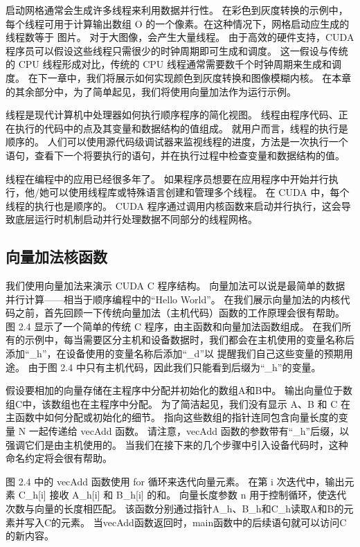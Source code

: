 启动网格通常会生成许多线程来利用数据并行性。 在彩色到灰度转换的示例中，每个线程可用于计算输出数组 O 的一个像素。在这种情况下，网格启动应生成的线程数等于 图片。 对于大图像，会产生大量线程。 由于高效的硬件支持，CUDA 程序员可以假设这些线程只需很少的时钟周期即可生成和调度。 这一假设与传统的 CPU 线程形成对比，传统的 CPU 线程通常需要数千个时钟周期来生成和调度。 在下一章中，我们将展示如何实现颜色到灰度转换和图像模糊内核。 在本章的其余部分中，为了简单起见，我们将使用向量加法作为运行示例。

\begin{remark}[线程]
线程是现代计算机中处理器如何执行顺序程序的简化视图。 线程由程序代码、正在执行的代码中的点及其变量和数据结构的值组成。 就用户而言，线程的执行是顺序的。 人们可以使用源代码级调试器来监视线程的进度，方法是一次执行一个语句，查看下一个将要执行的语句，并在执行过程中检查变量和数据结构的值。

线程在编程中的应用已经很多年了。 如果程序员想要在应用程序中开始并行执行，他/她可以使用线程库或特殊语言创建和管理多个线程。 在 CUDA 中，每个线程的执行也是顺序的。 CUDA 程序通过调用内核函数来启动并行执行，这会导致底层运行时机制启动并行处理数据不同部分的线程网格。
\end{remark}

\subsection{向量加法核函数}
我们使用向量加法来演示 CUDA C 程序结构。 向量加法可以说是最简单的数据并行计算——相当于顺序编程中的“Hello World”。 在我们展示向量加法的内核代码之前，首先回顾一下传统向量加法（主机代码）函数的工作原理会很有帮助。 图 2.4 显示了一个简单的传统 C 程序，由主函数和向量加法函数组成。 在我们所有的示例中，每当需要区分主机和设备数据时，我们都会在主机使用的变量名称后添加“\_h”，在设备使用的变量名称后添加“\_d”以 提醒我们自己这些变量的预期用途。 由于图 2.4 中只有主机代码，因此我们只能看到后缀为“\_h”的变量。

假设要相加的向量存储在主程序中分配并初始化的数组A和B中。 输出向量位于数组C中，该数组也在主程序中分配。 为了简洁起见，我们没有显示 A、B 和 C 在主函数中如何分配或初始化的细节。 指向这些数组的指针连同包含向量长度的变量 N 一起传递给 vecAdd 函数。 请注意，vecAdd 函数的参数带有“\_h”后缀，以强调它们是由主机使用的。 当我们在接下来的几个步骤中引入设备代码时，这种命名约定将会很有帮助。

图 2.4 中的 vecAdd 函数使用 for 循环来迭代向量元素。 在第 i 次迭代中，输出元素 C\_h[i] 接收 A\_h[i] 和 B\_h[i] 的和。 向量长度参数 n 用于控制循环，使迭代次数与向量的长度相匹配。 该函数分别通过指针A\_h、B\_h和C\_h读取A和B的元素并写入C的元素。 当vecAdd函数返回时，main函数中的后续语句就可以访问C的新内容。

